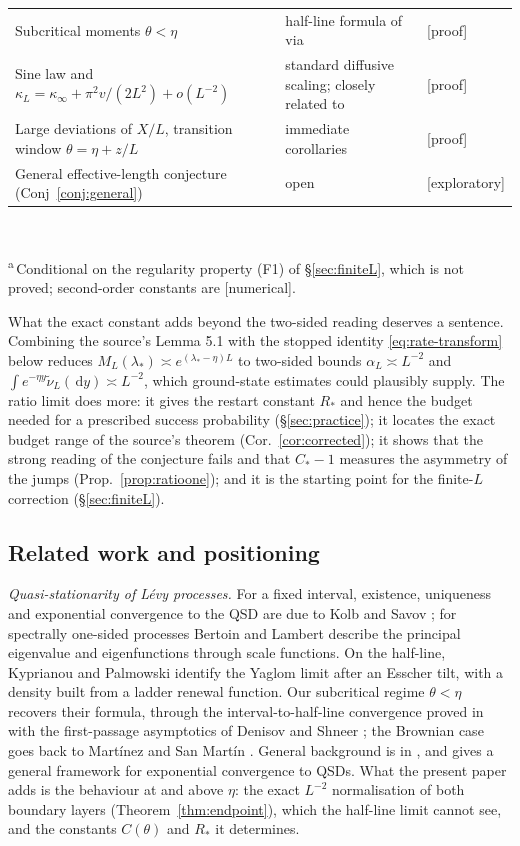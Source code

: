 \documentclass[11pt,a4paper]{article}
\theoremstyle{definition}
\theoremstyle{remark}
\newcommand{\1}{\mathbf 1}
\newcommand{\dd}{\,\mathrm d}
\newcommand{\kinf}{\kappa_\infty}
\newcommand{\status}[1]{\textsf{[#1]}}
\begin{document}
\begin{table}[h]
\begin{tabularx}{\textwidth}{@{}Xp{}l@{}}
Subcritical moments $\theta<\eta$ & half-line formula of \cite{kypalm} via \cite[Lemma 6.1]{garcia} & \status{proof}\\
Sine law and $\kappa_L=\kinf+\pi^2v/(2L^2)+o(L^{-2})$ & standard diffusive scaling; closely related to \cite{lotovkh} & \status{proof}\\
Large deviations of $X/L$, transition window $\theta=\eta+z/L$ & immediate corollaries & \status{proof}\\
General effective-length conjecture (Conj~\ref{conj:general}) & open & \status{exploratory}\\
\bottomrule
\end{tabularx}\\[2pt]
\raggedright\footnotesize\textsuperscript{a}\,Conditional on the regularity property (F1) of \S\ref{sec:finiteL}, which is not proved; second-order constants are \status{numerical}.
\end{table}

What the exact constant adds beyond the two-sided reading deserves a sentence. Combining the source's Lemma 5.1 with the stopped identity \eqref{eq:rate-transform} below reduces $M_L(\lambda_*)\asymp e^{(\lambda_*-\eta)L}$ to two-sided bounds $\alpha_L\asymp L^{-2}$ and $\int e^{-\eta y}\widetilde\nu_L(\dd y)\asymp L^{-2}$, which ground-state estimates could plausibly supply. The ratio limit does more: it gives the restart constant $R_*$ and hence the budget needed for a prescribed success probability (\S\ref{sec:practice}); it locates the exact budget range of the source's theorem (Cor.~\ref{cor:corrected}); it shows that the strong reading of the conjecture fails and that $C_*-1$ measures the asymmetry of the jumps (Prop.~\ref{prop:ratioone}); and it is the starting point for the finite-$L$ correction (\S\ref{sec:finiteL}).

\subsection{Related work and positioning}\label{sec:related}
\emph{Quasi-stationarity of L\'evy processes.} For a fixed interval, existence, uniqueness and exponential convergence to the QSD are due to Kolb and Savov \cite{kolbsavov}; for spectrally one-sided processes Bertoin \cite{bertoin97} and Lambert \cite{lambert} describe the principal eigenvalue and eigenfunctions through scale functions. On the half-line, Kyprianou and Palmowski \cite{kypalm} identify the Yaglom limit after an Esscher tilt, with a density built from a ladder renewal function. Our subcritical regime $\theta<\eta$ recovers their formula, through the interval-to-half-line convergence proved in \cite[Lemma 6.1]{garcia} with the first-passage asymptotics of Denisov and Shneer \cite{denisovshneer}; the Brownian case goes back to Mart\'inez and San Mart\'in \cite{martinezsm}. General background is in \cite{cms,melvill}, and \cite{champvill} gives a general framework for exponential convergence to QSDs. What the present paper adds is the behaviour at and above $\eta$: the exact $L^{-2}$ normalisation of both boundary layers (Theorem~\ref{thm:endpoint}), which the half-line limit cannot see, and the constants $C(\theta)$ and $R_*$ it determines.
\end{document}
